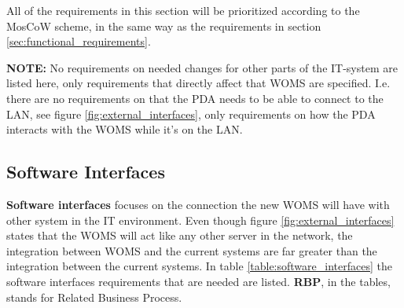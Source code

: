All of the requirements in this section will be prioritized according to the MosCoW scheme, in the same way as the requirements in section \ref{sec:functional_requirements}.	

\textbf{NOTE:} No requirements on needed changes for other parts of the IT-system are listed here, only requirements that directly affect that WOMS are specified. I.e. there are no requirements on that the PDA needs to be able to connect to the LAN, see figure \ref{fig:external_interfaces}, only requirements on how the PDA interacts with the WOMS while it's on the LAN.

\subsection{Software Interfaces}
\label{sub:software_interfaces}

\textbf{Software interfaces} focuses on the connection the new WOMS will have with other system in the IT environment. Even though figure \ref{fig:external_interfaces} states that the WOMS will act like any other server in the network, the integration between WOMS and the current systems are far greater than the integration between the current systems.  In table \ref{table:software_interfaces} the software interfaces requirements that are needed are listed. \textbf{RBP}, in the tables, stands for Related Business Process.

